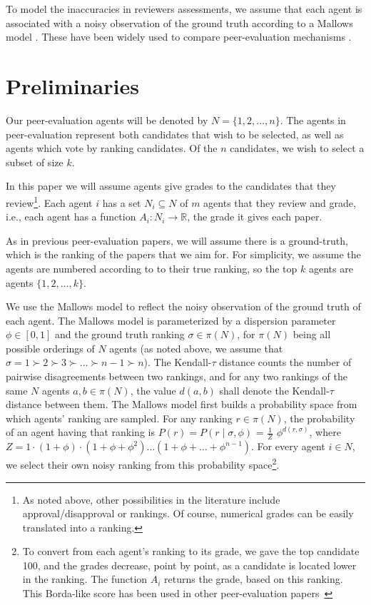 \documentclass[letterpaper]{article} %
\begin{document}
To model the inaccuracies in reviewers assessments, we assume that each agent is associated with a noisy observation of the ground truth according to a Mallows model \cite{Mal57}. These have been widely used to compare peer-evaluation mechanisms \cite{ALMRW16,ALMRW19,MTZ20,LMTZ23}.

\section{Preliminaries}\label{prelim}

Our peer-evaluation agents will be denoted by $N=\{1,2,\ldots,n\}$. The agents in peer-evaluation represent both candidates that wish to be selected, as well as agents which vote by ranking candidates. Of the $n$ candidates, we wish to select a subset of size $k$.

In this paper we will assume agents give grades to the candidates that they review\footnote{As noted above, other possibilities in the literature include approval/disapproval or rankings. Of course, numerical grades can be easily translated into a ranking.}. Each agent $i$ has a set $N_{i}\subseteq N$ of $m$ agents that they review and grade, i.e., each agent has a function $A_{i}:N_{i}\rightarrow \mathbb{R}$, the grade it gives each paper.

As in previous peer-evaluation papers, we will assume there is a ground-truth, which is the ranking of the papers that we aim for. For simplicity, we assume the agents are numbered according to to their true ranking, so the top $k$ agents are agents $\{1,2,\ldots,k\}$.

We use the Mallows model to reflect the noisy observation of the ground truth of each agent. The Mallows model is parameterized by a dispersion parameter $\phi\in [0,1]$ and the ground truth ranking $\sigma\in\pi(N)$, for $\pi(N)$ being all possible orderings of $N$ agents (as noted above, we assume that $\sigma=1\succ 2\succ 3\succ\ldots\succ n-1\succ n$). The Kendall-$\tau$ distance counts the number of pairwise disagreements between two rankings, and for any two rankings of the same $N$ agents $a,b\in\pi(N)$, the value $d(a,b)$ shall denote the Kendall-$\tau$ distance between them. The Mallows model first builds a probability space from which agents' ranking are sampled. For any ranking $r\in\pi(N)$, the probability of an agent having that ranking is $P(r) = P(r \mid \sigma,\phi)$ = $\frac{1}{Z}$ $\phi^{d(r,\sigma)}$, where $Z = 1\cdot(1+\phi)\cdot(1+\phi+\phi^2) \ldots (1+ \phi+ \ldots +\phi^{n-1})$. For every agent $i\in N$, we select their own noisy ranking from this probability space\footnote{To convert from each agent's ranking to its grade, we gave the top candidate 100, and the grades decrease, point by point, as a candidate is located lower in the ranking. The function $A_{i}$ returns the grade, based on this ranking. This Borda-like score has been used in other peer-evaluation papers~\cite{ALMRW16,ALMRW19}}.
\end{document}
